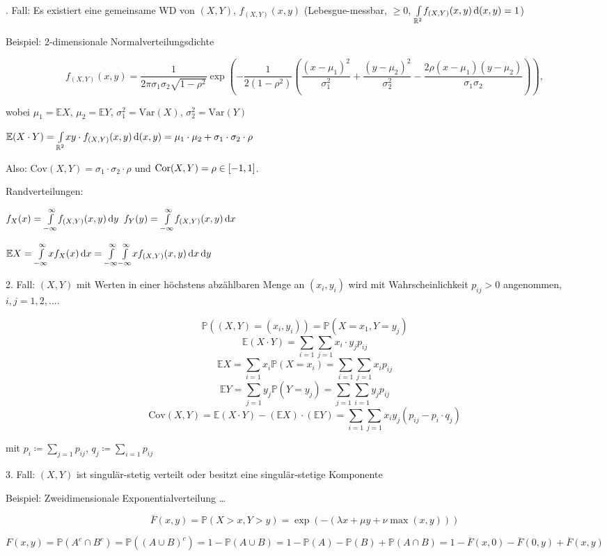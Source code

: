 \documentclass{cheat-sheet}
\renewcommand{\P}{\mathbb{P}} %
\newcommand{\E}{\mathbb{E}} %
\newcommand{\Var}{\mathrm{Var}} %
\newcommand{\Cov}{\mathrm{Cov}} %
\newcommand{\cor}{\mathrm{Cor}} %
\begin{document}
. Fall: Es existiert eine gemeinsame WD von $(X, Y)$, $f_{(X, Y)}(x, y)$ (Lebesgue-messbar, $\geq 0$, ${\textstyle \int\limits_{\mathbb{R}^2}^{}} f_{(X,Y)}(x,y) \,\mathrm{d} (x, y) = 1$)

  Beispiel: $2$-dimensionale Normalverteilungsdichte

  \[ f_{(X,Y)}(x,y) = \frac{1}{2 \pi \sigma_1 \sigma_2 \sqrt{1 - \rho^2}} \exp \left( - \frac{1}{2 (1 - \rho^2)} \left( \frac{(x-\mu_1)^2}{\sigma_1^2} + \frac{(y-\mu_2)^2}{\sigma_2^2} - \frac{2 \rho (x-\mu_1)(y-\mu_2)}{\sigma_1 \sigma_2} \right) \right), \]

  wobei $\mu_1 = \E X$, $\mu_2 = \E Y$, $\sigma_1^2 = \Var(X)$, $\sigma_2^2 = \Var(Y)$

  $\E (X \cdot Y) = \Int{\R^2}{}{x y \cdot f_{(X,Y)}(x,y)}{(x, y)} = \mu_1 \cdot \mu_2 + \sigma_1 \cdot \sigma_2 \cdot \rho$

  Also: $\Cov(X, Y) = \sigma_1 \cdot \sigma_2 \cdot \rho$ und $\cor(X, Y) = \rho \in \cinterval{-1}{1}$.

  Randverteilungen:

  $f_X(x) = {\textstyle \int\limits_{-\infty}^{\infty}} f_{(X,Y)}(x,y) \,\mathrm{d} y$
  $f_Y(y) = {\textstyle \int\limits_{-\infty}^{\infty}} f_{(X,Y)}(x,y) \,\mathrm{d} x$

  $\E X = \Int{-\infty}{\infty}{x f_X(x)}{x} = \Int{-\infty}{\infty}{\Int{-\infty}{\infty}{x f_{(X,Y)}(x,y)}{x}}{y}$

  2. Fall: $(X, Y)$ mit Werten in einer höchstens abzählbaren Menge an $(x_i, y_i)$ wird mit Wahrscheinlichkeit $p_{ij} > 0$ angenommen, $i, j = 1, 2, ...$.

  \[ \P((X, Y) = (x_i, y_i)) = \P(X=x_1, Y=y_j) \]
  \[ \E(X \cdot Y) = \sum_{i=1} \sum_{j=1} x_i \cdot y_j p_{ij} \]
  \[ \E X = \sum_{i=1} x_i \P(X = x_i) = \sum_{i=1} \sum_{j=1} x_i p_{ij} \]
  \[ \E Y = \sum_{j=1} y_j \P(Y = y_j) = \sum_{j=1} \sum_{i=1} y_j p_{ij} \]
  \[ \Cov(X, Y) = \E (X \cdot Y) - (\E X) \cdot (\E Y) = \sum_{i=1} \sum_{j=1} x_i y_j (p_{ij} - p_i \cdot q_j) \]

  mit $p_i \coloneqq \sum_{j=1} p_{ij}$, $q_j \coloneqq \sum_{i=1} p_{ij}$

  3. Fall: $(X, Y)$ ist singulär-stetig verteilt oder besitzt eine singulär-stetige Komponente

  Beispiel: Zweidimensionale Exponentialverteilung \ldots

  \[ \overline{F}(x,y) = \P(X > x, Y > y) = \exp \left( -(\lambda x + \mu y + \nu \max(x,y)) \right) \]

  \[ F(x, y) = \P(A^c \cap B^c) = \P((A \cup B)^c) = 1 - \P(A \cup B) = 1 - \P(A) - \P(B) + \P(A \cap B) = 1 - \overline{F}(x,0) - \overline{F}(0,y) + \overline{F}(x,y) \]
\end{document}

